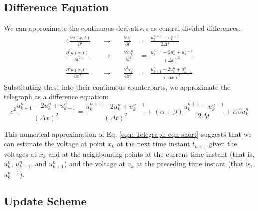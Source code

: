 \documentclass{article}
\begin{document}
\subsection{Difference Equation}
\label{subsec: Difference Equation}

We can approximate the continuous derivatives as central divided differences:
\begin{alignat*}{4}
   \frac{\partial u \left(x,t\right)}{\partial t}
   &\quad\longrightarrow\quad&
   \frac{\partial u_{k}^{n}}{\partial t}
   &=\ 
   \frac{u_{k}^{n+1} - u_{k}^{n-1}}{2 \Delta t} \\
   \frac{\partial^{2} u \left(x,t\right)}{\partial t^{2}}
   &\quad\longrightarrow\quad&
   \frac{\partial{2} u_{k}^{n}}{\partial t^{2}}
   &=\ 
   \frac{u_{k}^{n+1} - 2 u_{k}^{n} + u_{k}^{n-1}}{\left(\Delta t\right)^{2}} \\
   \frac{\partial^{2} u \left(x,t\right)}{\partial x^{2}}
   &\quad\longrightarrow\quad&
   \frac{\partial^{2} u_{k}^{n}}{\partial x^{2}}
   &=\ 
   \frac{u_{k+1}^{n} - 2 u_{k}^{n} + u_{k-1}^{n}}{\left(\Delta x\right)^{2}}
\end{alignat*}
Substituting these into their continuous counterparts, we approximate the telegraph as a difference equation:
\begin{equation}
   \label{eqn: Difference eqn full}
   c^{2} \frac{u_{k+1}^{n} - 2 u_{k}^{n} + u_{k-1}^{n}}{\left(\Delta x\right)^{2}}
   =
   \frac{u_{k}^{n+1} - 2 u_{k}^{n} + u_{k}^{n-1}}{\left(\Delta t\right)^{2}}
   +
   \left(\alpha + \beta\right) \frac{u_{k}^{n+1} - u_{k}^{n-1}}{2 \Delta t}
   +
   \alpha \beta u_{k}^{n}
\end{equation}

This numerical approximation of Eq. \ref{eqn: Telegraph eqn short} suggests that we can estimate the voltage
at point $x_{k}$ at the next time instant $t_{n+1}$ given the voltages at $x_{k}$ and
at the neighbouring points at the current time instant
(that is, $u_{k}^{n}$, $u_{k-1}^{n}$, and $u_{k+1}^{n}$) and
the voltage at $x_{k}$ at the preceding time instant
(that is, $u_{k}^{n-1}$).

\subsection{Update Scheme}
\label{subsec: Update Scheme}
\end{document}
